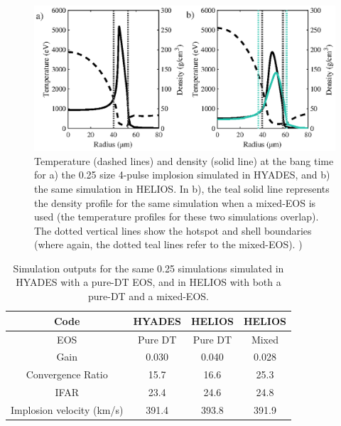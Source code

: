 \begin{figure} 
	\centering     %
	\includegraphics[width=.8\textwidth]{figures/FurtherSims/MixedEOS.eps}
	\caption{\label{fig:MixedEOS} Temperature (dashed lines) and density (solid line) at the bang time for a) the 0.25 size 4-pulse implosion simulated in HYADES, and b) the same simulation in HELIOS. In b), the teal solid line represents the density profile for the same simulation when a mixed-EOS is used (the temperature profiles for these two simulations overlap). The dotted vertical lines show the hotspot and shell boundaries (where again, the dotted teal lines refer to the mixed-EOS). )}
\end{figure}

\begin{table}
	\centering
	\begin{tabular}{|c|c|c|c|}
		\hline
		Code &  HYADES & HELIOS & HELIOS \\ 
		\hline
		EOS & Pure DT & Pure DT & Mixed \\
		\hline
		Gain & 0.030 & 0.040 & 0.028  \\
		Convergence Ratio & 15.7 & 16.6 & 25.3 \\ 
		IFAR & 23.4 & 24.6 & 24.8 \\ 
		Implosion velocity (km/s) & 391.4 & 393.8 & 391.9 \\
		\hline
	\end{tabular}
	\caption{Simulation outputs for the same 0.25 simulations simulated in HYADES with a pure-DT EOS, and in HELIOS with both a pure-DT and a mixed-EOS.}
	\label{tab:MixedEOS}
\end{table}

